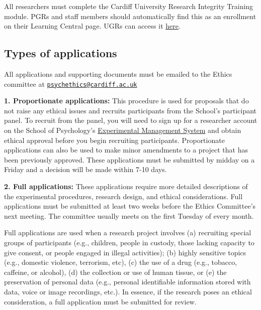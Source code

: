 \documentclass[
  12pt,
]{book}
\begin{document}
All researchers must complete the Cardiff University Research Integrity Training module. PGRs and staff members should automatically find this as an enrollment on their Learning Central page. UGRs can access it \href{https://intranet.cardiff.ac.uk/staff/training-and-development/staff-courses-and-programmes/research-careers/training/research-integrity-online-training-programme}{here}.

\subsection{Types of applications}\label{types-of-applications}

All applications and supporting documents must be emailed to the Ethics committee at \href{mailto:psychethics@cardiff.ac.uk}{\nolinkurl{psychethics@cardiff.ac.uk}}

\textbf{1. Proportionate applications:} This procedure is used for proposals that do not raise any ethical issues and recruits participants from the School's participant panel. To recruit from the panel, you will need to sign up for a researcher account on the School of Psychology's \href{https://cardiff.sona-systems.com/Default.aspx?ReturnUrl=/}{Experimental Management System} and obtain ethical approval before you begin recruiting participants. Proportionate applications can also be used to make minor amendments to a project that has been previously approved. These applications must be submitted by midday on a Friday and a decision will be made within 7-10 days.

\textbf{2. Full applications:} These applications require more detailed descriptions of the experimental procedures, research design, and ethical considerations. Full applications must be submitted at least two weeks before the Ethics Committee's next meeting. The committee usually meets on the first Tuesday of every month.

Full applications are used when a research project involves (a) recruiting special groups of participants (e.g., children, people in custody, those lacking capacity to give consent, or people engaged in illegal activities); (b) highly sensitive topics (e.g., domestic violence, terrorism, etc), (c) the use of a drug (e.g., tobacco, caffeine, or alcohol), (d) the collection or use of human tissue, or (e) the preservation of personal data (e.g., personal identifiable information stored with data, voice or image recordings, etc.). In essence, if the research poses an ethical consideration, a full application must be submitted for review.
\end{document}
